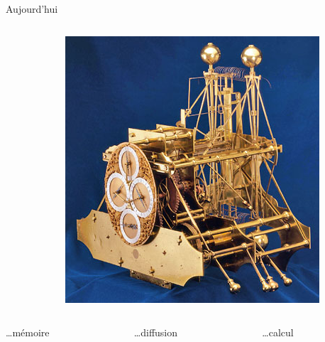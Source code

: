 \begin{frame}{Aujourd'hui}
\begin{columns}
\begin{column}{0.33\linewidth}
\end{column}
\begin{column}{0.33\linewidth}
\centering
\includegraphics[height=0.35\paperheight]{../resources/illustrations/harrison} \\
\end{column}
\end{columns}

\vfill

\begin{columns}
\begin{column}{0.33\linewidth}
\centering
\ldots mémoire
\end{column}
\begin{column}{0.33\linewidth}
\centering
\ldots diffusion
\end{column}
\begin{column}{0.33\linewidth}
\centering
\ldots calcul
\end{column}
\end{columns}
\end{frame}
